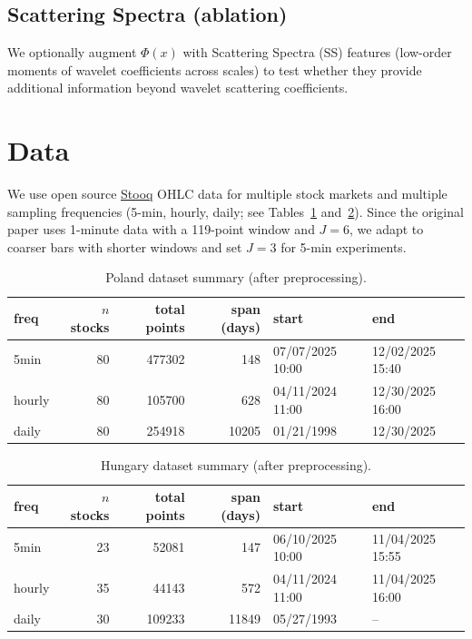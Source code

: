 \documentclass[10pt]{article}
\begin{document}
\subsection{Scattering Spectra (ablation)}
We optionally augment $\Phi(x)$ with Scattering Spectra (SS) features (low-order moments of wavelet coefficients across scales) to test whether they provide additional information beyond wavelet scattering coefficients.

\section{Data}

We use open source \href{https://stooq.com}{Stooq} OHLC data for multiple stock markets and multiple sampling frequencies (5-min, hourly, daily; see Tables~\ref{tab:data_poland} and~\ref{tab:data_hungary}). Since the original paper uses 1-minute data with a 119-point window and $J=6$, we adapt to coarser bars with shorter windows and set $J=3$ for 5-min experiments.

\begin{table}[t]
\centering
\scriptsize
\setlength{\tabcolsep}{4pt}
\renewcommand{\arraystretch}{1.15}
\begin{tabular}{lrrrll}
\toprule
freq & $n$ stocks & total points & span (days) & start & end \\
\midrule
5min   & 80 & 477302 & 148   & 07/07/2025 10:00 & 12/02/2025 15:40 \\
hourly & 80 & 105700 & 628   & 04/11/2024 11:00 & 12/30/2025 16:00 \\
daily  & 80 & 254918 & 10205 & 01/21/1998       & 12/30/2025 \\
\bottomrule
\end{tabular}
\caption{Poland dataset summary (after preprocessing).}
\label{tab:data_poland}
\end{table}

\begin{table}[t]
\centering
\scriptsize
\setlength{\tabcolsep}{4pt}
\renewcommand{\arraystretch}{1.15}
\begin{tabular}{lrrrll}
\toprule
freq & $n$ stocks & total points & span (days) & start & end \\
\midrule
5min   & 23 &  52081 & 147   & 06/10/2025 10:00 & 11/04/2025 15:55 \\
hourly & 35 &  44143 & 572   & 04/11/2024 11:00 & 11/04/2025 16:00 \\
daily  & 30 & 109233 & 11849 & 05/27/1993       & -- \\
\bottomrule
\end{tabular}
\caption{Hungary dataset summary (after preprocessing).}
\label{tab:data_hungary}
\end{table}
\end{document}
